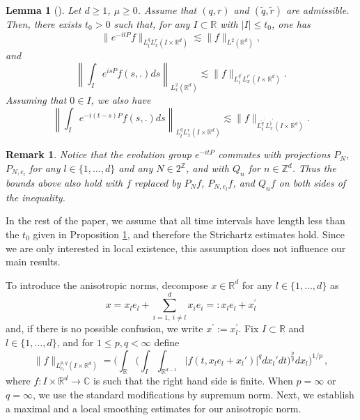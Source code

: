 \documentclass[10pt,leqno]{amsart}
\newtheorem{lem}[thm]{Lemma}
\newtheorem{rmq}[thm]{Remark}
\newcommand{\R}{\mathbb{R}}
\numberwithin{equation}{section}
\newcommand{\Z}{\mathbb{Z}}
\begin{document}
\begin{lem}[\cite{MR2787438,MR3852677,MR1151250,MR1646048}]
\label{strichartz}
Let $d\geq 1$, $\mu \geq 0$. Assume that $(q,r)$ and $(\tilde{q},\tilde{r})$ are admissible. Then, there exists $t_0>0$ such that, for any $I\subset \R$ with $|I|\leq t_0$, one has
\begin{equation}
\label{strichartze1}
\|e^{-it P} f\|_{L_t^q L_x^r (I\times \R^d)} \lesssim \|f\|_{L^2 (\R^d )},
\end{equation}
and
$$\left\|\int_I e^{is P  } f(s,.) ds\right\|_{L_x^2 (\R^d)}\lesssim \|f\|_{L_t^{q^\prime} L_x^{r^\prime} (I\times \R^d)}. $$
Assuming that $0\in I$, we also have
\begin{equation}
\label{strichartze3}
\left\|\int_I e^{-i(t-s)P  } f(s,.) ds \right\|_{L_t^q L_x^r (I\times \R^d)}\lesssim \|f\|_{L_t^{\tilde{q}^\prime} L_x^{\tilde{r}^\prime} (I\times \R^d)} . 
\end{equation}
\end{lem}
\begin{rmq}
Notice that the evolution group \(e^{-itP}\) commutes with projections \(P_{N}\), \(P_{N,e_{l}}\) for any \(l\in\{1,\ldots,d\}\) and any \(N\in2^{\Z}\), and with \(Q_{n}\) for \(n\in\Z^{d}\). Thus the bounds above also hold with \(f\) replaced by \(P_{N}f\), \(P_{N,e_{l}}f\), and \(Q_{n}f\) on both sides of the inequality.
\end{rmq}

In the rest of the paper, we assume that all time intervals have length less than the $t_0$ given in Proposition \ref{strichartz}, and therefore the Strichartz estimates hold. 
Since we are only interested in local existence, this assumption does not influence our main results.

 To introduce the anisotropic norms, decompose $x\in \R^d$  for any $l \in \{1, \dots, d\}$ as
$$
x=x_l e_l+\displaystyle\sum_{i=1,\ i\neq l}^d x_i e_i =: x_l e_l + x^\prime_l 
$$
and, if there is no possible confusion, we write $x^\prime := x_l^\prime$.  
Fix $I \subset \R$ and $l \in \{1, \dots, d\}$,  and for $1 \leq p,q<\infty$ define
$$\|f\|_{L_{e_l}^{p,q} (I\times \R^d )} = \Bigg(\int_{\R}  \Bigg(\int_I \int_{\R^{d-1}} |f(t,x_le_{l}+x_l')|^q dx_l' dt\Bigg)^{\frac{p}{q}} dx_l \Bigg)^{1/p} \,,$$
where $f : I \times \R^d \to \mathbb{C}$ is such that the right hand side is finite.
When $p=\infty$ or $q=\infty$, we use the standard modifications by supremum norm. 
Next, we establish a maximal and a local smoothing estimates for our anisotropic norm. 
\end{document}
